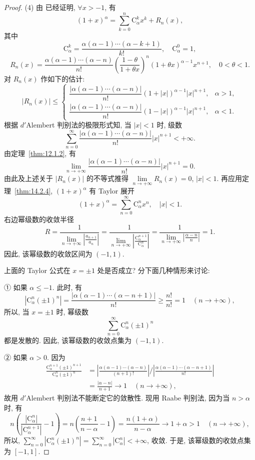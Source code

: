 \begin{proof}
(4) 由 已经证明, $\forall x>-1$, 有
\[
  (1+x)^{\alpha}=\sum_{k=0}^{n}\mathrm{C}_{\alpha}^{k}x^{k}+R_{n}(x),
\]
其中
\[
  \mathrm{C}_{\alpha}^{k}=\frac{\alpha(\alpha-1)\cdots(\alpha-k+1)}{k!},\quad\mathrm{C}_{\alpha}^{0}=1,
\]
\[
  R_{n}(x)=\frac{\alpha(\alpha-1)\cdots(\alpha-n)}{n!}\left(\frac{1-\theta}{1+\theta x}\right)^{n}(1+\theta x)^{\alpha-1}x^{n+1},\quad0<\theta<1.
\]
对 $R_{n}(x)$ 作如下的估计:
\[
  |R_{n}(x)|\leqslant\begin{cases}
    \dfrac{|\alpha(\alpha-1)\cdots(\alpha-n)|}{n!}(1+|x|)^{\alpha-1}|x|^{n+1}, & \alpha>1,\\[2ex]
    \dfrac{|\alpha(\alpha-1)\cdots(\alpha-n)|}{n!}(1-|x|)^{\alpha-1}|x|^{n+1}, & \alpha<1.
\end{cases}
\]
根据 $d'$Alembert 判别法的极限形式知, 当 $|x|<1$ 时, 级数
\[
  \sum_{n=0}^{\infty}\frac{|\alpha(\alpha-1)\cdots(\alpha-n)|}{n!}|x|^{n+1}<+\infty.
\]
由定理~\ref{thm:12.1.2}, 有
\[
  \lim_{n\to+\infty}\frac{|\alpha(\alpha-1)\cdots(\alpha-n)|}{n!}|x|^{n+1}=0.
\]
由此及上述关于 $|R_{n}(x)|$ 的不等式推得 $\lim\limits_{n\to+\infty}R_{n}(x)=0$, $|x|<1$. 再应用定理~\ref{thm:14.2.4}, $(1+x)^{\alpha}$ 有 Taylor 展开
\[
  (1+x)^{\alpha}=\sum_{n=0}^{\infty}\mathrm{C}_{\alpha}^{n}x^{n},\quad|x|<1.
\]
右边幂级数的收敛半径
\[
  R=\frac{1}{\lim\limits_{n\to+\infty}\left|\frac{a_{n+1}}{a_{n}}\right|}=\frac{1}{\lim\limits_{n\to+\infty}\left|\frac{\mathrm{C}_{\alpha}^{n+1}}{\mathrm{C}_{\alpha}^{n}}\right|}=\frac{1}{\lim\limits_{n\to+\infty}\left|\frac{\alpha-n}{n}\right|}=1.
\]
因此, 该幂级数的收敛区间为 $(-1,1)$.

上面的 Taylor 公式在 $x=\pm1$ 处是否成立? 分下面几种情形来讨论:

① 如果 $\alpha\leqslant-1$. 此时, 有
\[
  \left|\mathrm{C}_{\alpha}^{n}(\pm1)^{n}\right|=\frac{|\alpha(\alpha-1)\cdots(\alpha-n+1)|}{n!}\geqslant\frac{n!}{n!}=1\quad(n\rightarrow+\infty),
\]
所以, 当 $x=\pm1$ 时, 幂级数
\[
  \sum_{n=0}^{\infty}\mathrm{C}_{\alpha}^{n}(\pm1)^{n}
\]
都是发散的. 因此, 该幂级数的收敛点集为 $(-1,1)$.

② 如果 $\alpha>0$. 因为
\[
  \begin{aligned}
    \frac{\mathrm{C}_{\alpha}^{n+1}(\pm1)^{n+1}}{\mathrm{C}_{\alpha}^{n}(\pm1)^{n}}&=\left|\frac{\alpha(\alpha-1)\cdots(\alpha-n)}{(n+1)!}\right|\bigg/\left|\frac{\alpha(\alpha-1)\cdots(\alpha-n+1)}{n!}\right|\\
    &=\frac{|\alpha-n|}{n+1}\to1\quad(n\to+\infty),
  \end{aligned}
\]
故用 $d'$Alembert 判别法不能断定它的敛散性. 现用 Raabe 判别法, 因为当 $n>\alpha$ 时, 有
\[
  n\left(\frac{|\mathrm{C}_{\alpha}^{n}|}{|\mathrm{C}_{\alpha}^{n+1}|}-1\right)=n\left(\frac{n+1}{n-\alpha}-1\right)=\frac{n(1+\alpha)}{n-\alpha}\to1+\alpha>1\quad(n\to+\infty),
\]
所以, $\sum_{n=0}^{\infty}|\mathrm{C}_{\alpha}^{n}(\pm1)^{n}|=\sum_{n=0}^{\infty}|\mathrm{C}_{\alpha}^{n}|<+\infty$, 收敛. 于是, 该幂级数的收敛点集为 $[-1,1]$.


\end{proof}
